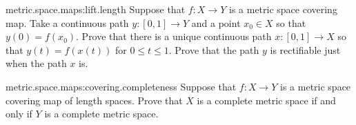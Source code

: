 \begin{problem}{metric.space.maps:lift.length}
Suppose that \(f \colon X \to Y\) is a metric space covering map.
Take a continuous path \(y \colon [0,1] \to Y\) and a point \(x_0 \in X\) so that \(y(0)=f(x_0)\).
Prove that there is a unique continuous path \(x \colon [0,1] \to X\) so that \(y(t)=f(x(t))\) for \(0 \le t \le 1\).
Prove that the path \(y\) is rectifiable just when the path \(x\) is.
\end{problem}
\begin{problem}{metric.space.maps:covering.completeness}
Suppose that \(f \colon X \to Y\) is a metric space covering map of length spaces.
Prove that \(X\) is a complete metric space if and only if \(Y\) is a complete metric space.
\end{problem}
